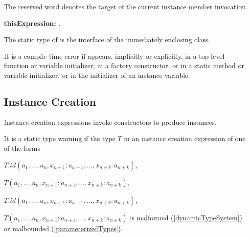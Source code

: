 \documentclass{article}
\begin{document}
\LMHash{}
The reserved word \THIS{} denotes the target of the current instance member invocation.

\begin{grammar}
{\bf thisExpression:}
      \THIS{}
     .
\end{grammar}

\LMHash{}
The static type of \THIS{} is the interface of the immediately enclosing class.


\LMHash{}
It is a compile-time error if \THIS{} appears, implicitly or explicitly,  in a top-level function or variable initializer,  in a factory constructor, or in a static method or variable initializer, or in the initializer of an instance variable.

\subsection{ Instance Creation}

\LMHash{}
Instance creation expressions invoke constructors to produce instances.



\LMHash{}
It is a static type warning if
the type $T$ in an instance creation expression of one of  the forms

\NEW{} $T.id(a_1, \ldots , a_n, x_{n+1}: a_{n+1}, \ldots , x_{n+k}: a_{n+k})$,

\NEW{} $T(a_1, \ldots , a_n, x_{n+1}: a_{n+1}, \ldots , x_{n+k}: a_{n+k})$,

\CONST{} $T.id(a_1, \ldots , a_n, x_{n+1}: a_{n+1}, \ldots , x_{n+k}: a_{n+k})$,

\CONST{} $T(a_1, \ldots , a_n, x_{n+1}: a_{n+1}, \ldots , x_{n+k}: a_{n+k})$ is malformed (\ref{dynamicTypeSystem}) or malbounded (\ref{parameterizedTypes}).
\end{document}
